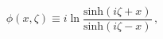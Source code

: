 \begin{equation}
\phi (x,\zeta)\equiv i\ln \frac {{\mbox {sinh}} (i\zeta+x)}{{\mbox {sinh}} (i\zeta-x)}\, , \label {funz}
\end{equation}

